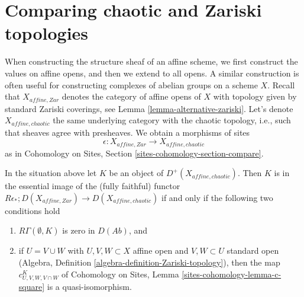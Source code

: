 \section{Comparing chaotic and Zariski topologies}
\label{section-compare-chaotic-Zariski}

\noindent
When constructing the structure sheaf of an affine scheme, we first
construct the values on affine opens, and then we extend to all opens.
A similar construction is often useful for constructing complexes
of abelian groups on a scheme $X$. Recall that $X_{affine, Zar}$
denotes the category of affine opens of $X$ with topology given
by standard Zariski coverings, see Lemma \ref{lemma-alternative-zariski}.
Let's denote $X_{affine, chaotic}$ the same underlying
category with the chaotic topology, i.e., such that sheaves
agree with presheaves. We obtain a morphisms of sites
$$
\epsilon : X_{affine, Zar} \longrightarrow X_{affine, chaotic}
$$
as in Cohomology on Sites, Section \ref{sites-cohomology-section-compare}.

\begin{lemma}
\label{lemma-check-zar}
In the situation above let $K$ be an object of $D^+(X_{affine, chaotic})$.
Then $K$ is in the essential image of the (fully faithful) functor
$R\epsilon_* ; D(X_{affine, Zar}) \to D(X_{affine, chaotic})$ if and only
if the following two conditions hold
\begin{enumerate}
\item $R\Gamma(\emptyset, K)$ is zero in $D(\textit{Ab})$, and
\item if $U = V \cup W$ with $U, V, W \subset X$ affine open and
$V, W \subset U$ standard open
(Algebra, Definition \ref{algebra-definition-Zariski-topology}), then
the map $c^K_{U, V, W, V \cap W}$ of
Cohomology on Sites, Lemma \ref{sites-cohomology-lemma-c-square}
is a quasi-isomorphism.
\end{enumerate}
\end{lemma}

